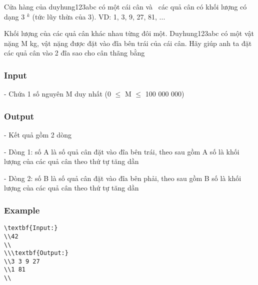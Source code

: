 



   Cửa hàng của duyhung123abc có một cái cân và  các quả cân có khối lượng có dạng 3   $^    k   $   (tức lũy thừa của 3). VD: 1, 3, 9, 27, 81, ...  

   Khối lượng của các quả cân khác nhau từng đôi một. Duyhung123abc có một vật nặng M kg, vật nặng được đặt vào đĩa bên trái của cái cân. Hãy giúp anh ta đặt các quả cân vào 2 đĩa sao cho cân thãng bằng  

\subsubsection{   Input  }

   - Chứa 1 số nguyên M duy nhất (0  $\le$  M  $\le$  100 000 000)  

\subsubsection{   Output  }

   - Kết quả gồm 2 dòng  

   - Dòng 1: số A là số quả cân đặt vào đĩa bên trái, theo sau gồm A số là khối lượng của các quả cân theo thứ tự tăng dần  

   - Dòng 2: số B là số quả cân đặt vào đĩa bên phải, theo sau gồm B số là khối lượng của các quả cân theo thứ tự tăng dần  

\subsubsection{   Example  }
\begin{verbatim}
\textbf{Input:}
\\42
\\
\\\textbf{Output:}
\\3 3 9 27
\\1 81
\\\end{verbatim}
